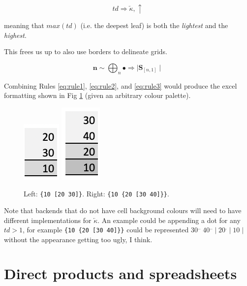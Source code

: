 \documentclass[11pt]{article}
\newcommand{\unit}{\bullet}
\begin{document}
\begin{equation} 
 td \Rightarrow \overleftarrow{\kappa}, \uparrow \label{eq:rule2}
\end{equation}

meaning that $max(td)$ (i.e. the deepest leaf) is both the \emph{lightest} and the \emph{highest}.

This frees us up to also use borders to delineate grids.

\begin{equation} 
 \mathbf{n} \sim \bigoplus_n \unit \Rightarrow \mid \mathbf{S}_{[n,1]} \mid  \label{eq:rule3}
\end{equation}

Combining Rules \ref{eq:rule1}, \ref{eq:rule2}, and \ref{eq:rule3} would produce the excel formatting shown in Fig \ref{fig:format1} (given an arbitrary colour palette). 

\begin{figure}[h] 
\centering
  \includegraphics[scale=0.7]{screenshots/10_2030.png}
    \includegraphics[scale=0.7]{screenshots/10_20_3040.png}
  \caption{Left: \texttt{\{10 [20 30]\}}. Right:  \texttt{\{10 \{20 [30 40]\}\}}.}
  \label{fig:format1}
\end{figure}

Note that backends  that do not have cell background colours will need to have different implementations for $\overleftarrow{\kappa}$. An example could be appending a dot for any $td > 1$, for example \verb|{10 {20 [30 40]}}| could be represented $30^{..}\; 40^{..}\;|\;20^{.}\;|\;10\;|$ without the appearance getting too ugly, I think.

\section{Direct products and spreadsheets}
\end{document}
